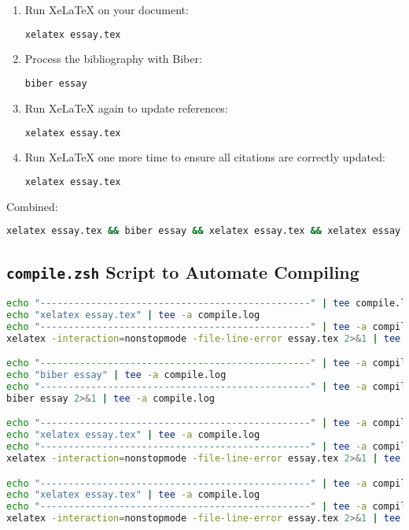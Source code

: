 \documentclass{article}
\begin{document}
\begin{enumerate}
    \item Run XeLaTeX on your document:
          \begin{lstlisting}[language=bash]
xelatex essay.tex
          \end{lstlisting}

    \item Process the bibliography with Biber:
          \begin{lstlisting}[language=bash]
biber essay
          \end{lstlisting}

    \item Run XeLaTeX again to update references:
          \begin{lstlisting}[language=bash]
xelatex essay.tex
          \end{lstlisting}

    \item Run XeLaTeX one more time to ensure all citations are correctly updated:
          \begin{lstlisting}[language=bash]
xelatex essay.tex
          \end{lstlisting}
\end{enumerate}

\noindent Combined:
\begin{lstlisting}[language=bash]
xelatex essay.tex && biber essay && xelatex essay.tex && xelatex essay.tex
\end{lstlisting}

\subsection*{\texttt{compile.zsh} Script to Automate Compiling}
\begin{lstlisting}[language=bash]
echo "------------------------------------------------" | tee compile.log
echo "xelatex essay.tex" | tee -a compile.log
echo "------------------------------------------------" | tee -a compile.log
xelatex -interaction=nonstopmode -file-line-error essay.tex 2>&1 | tee -a compile.log

echo "------------------------------------------------" | tee -a compile.log
echo "biber essay" | tee -a compile.log
echo "------------------------------------------------" | tee -a compile.log
biber essay 2>&1 | tee -a compile.log

echo "------------------------------------------------" | tee -a compile.log
echo "xelatex essay.tex" | tee -a compile.log
echo "------------------------------------------------" | tee -a compile.log
xelatex -interaction=nonstopmode -file-line-error essay.tex 2>&1 | tee -a compile.log

echo "------------------------------------------------" | tee -a compile.log
echo "xelatex essay.tex" | tee -a compile.log
echo "------------------------------------------------" | tee -a compile.log
xelatex -interaction=nonstopmode -file-line-error essay.tex 2>&1 | tee -a compile.log
\end{lstlisting}
\end{document}
